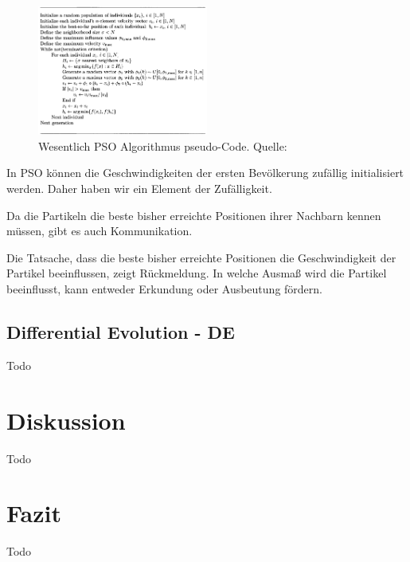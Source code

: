 \documentclass[twoside,twocolumn]{article}
\begin{document}
\begin{figure}[h]
\caption{ Wesentlich PSO Algorithmus pseudo-Code. Quelle: \cite{wiley_evolutionary}}
\label{fig:pso_pseudo}
\centering
\includegraphics[width=0.5\textwidth]{images/pso_pseudo.png}
\end{figure}

In PSO können die Geschwindigkeiten der ersten Bevölkerung zufällig initialisiert werden. Daher haben wir ein Element der Zufälligkeit.\par
Da die Partikeln die beste bisher erreichte Positionen ihrer Nachbarn kennen müssen, gibt es auch Kommunikation.\par
Die Tatsache, dass die beste bisher erreichte Positionen die Geschwindigkeit der Partikel beeinflussen, zeigt Rückmeldung. In welche Ausmaß wird die Partikel beeinflusst, kann entweder Erkundung oder Ausbeutung fördern.

\subsection{Differential Evolution - DE}
Todo


\section{Diskussion}

Todo


\section{Fazit}

Todo


\renewcommand{\refname}{Quellenverzeichnis}



\end{document}
